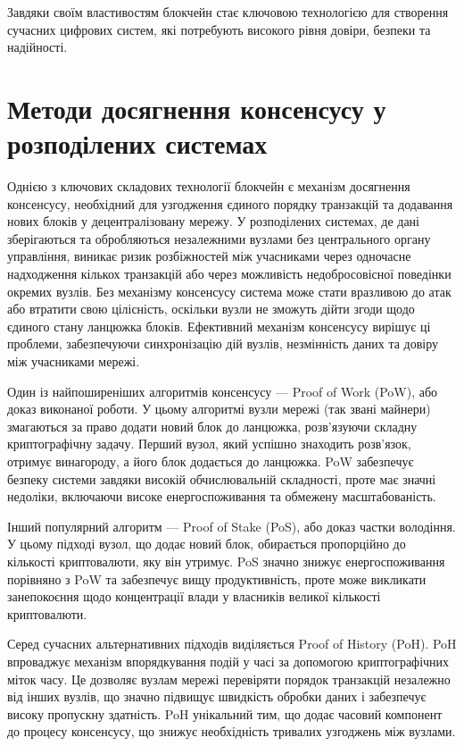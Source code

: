 \documentclass[14pt]{extreport}
\begin{document}
  Завдяки своїм властивостям блокчейн стає ключовою технологією для створення сучасних цифрових систем, які потребують високого рівня довіри, безпеки та надійності.

  \section{Методи досягнення консенсусу у розподілених системах}

  Однією з ключових складових технології блокчейн є механізм досягнення консенсусу, необхідний для узгодження єдиного порядку транзакцій та додавання нових блоків у децентралізовану мережу. У розподілених системах, де дані зберігаються та обробляються незалежними вузлами без центрального органу управління, виникає ризик розбіжностей між учасниками через одночасне надходження кількох транзакцій або через можливість недобросовісної поведінки окремих вузлів. Без механізму консенсусу система може стати вразливою до атак або втратити свою цілісність, оскільки вузли не зможуть дійти згоди щодо єдиного стану ланцюжка блоків. Ефективний механізм консенсусу вирішує ці проблеми, забезпечуючи синхронізацію дій вузлів, незмінність даних та довіру між учасниками мережі.

  Один із найпоширеніших алгоритмів консенсусу — Proof of Work (PoW), або доказ виконаної роботи. У цьому алгоритмі вузли мережі (так звані майнери) змагаються за право додати новий блок до ланцюжка, розв’язуючи складну криптографічну задачу. Перший вузол, який успішно знаходить розв’язок, отримує винагороду, а його блок додається до ланцюжка. PoW забезпечує безпеку системи завдяки високій обчислювальній складності, проте має значні недоліки, включаючи високе енергоспоживання та обмежену масштабованість.

  Інший популярний алгоритм — Proof of Stake (PoS), або доказ частки володіння. У цьому підході вузол, що додає новий блок, обирається пропорційно до кількості криптовалюти, яку він утримує. PoS значно знижує енергоспоживання порівняно з PoW та забезпечує вищу продуктивність, проте може викликати занепокоєння щодо концентрації влади у власників великої кількості криптовалюти.

  Серед сучасних альтернативних підходів виділяється Proof of History (PoH). PoH впроваджує механізм впорядкування подій у часі за допомогою криптографічних міток часу. Це дозволяє вузлам мережі перевіряти порядок транзакцій незалежно від інших вузлів, що значно підвищує швидкість обробки даних і забезпечує високу пропускну здатність. PoH унікальний тим, що додає часовий компонент до процесу консенсусу, що знижує необхідність тривалих узгоджень між вузлами.
\end{document}
